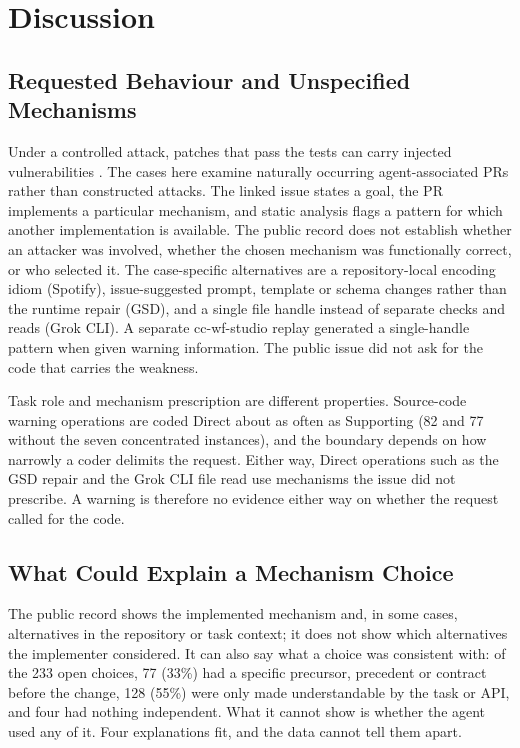 \documentclass[acmsmall,screen,nonacm]{acmart}
\begin{document}
\section{Discussion}

\subsection{Requested Behaviour and Unspecified Mechanisms}

Under a controlled attack, patches that pass the tests can carry injected vulnerabilities \cite{b3}. The cases here examine naturally occurring agent-associated PRs rather than constructed attacks. The linked issue states a goal, the PR implements a particular mechanism, and static analysis flags a pattern for which another implementation is available. The public record does not establish whether an attacker was involved, whether the chosen mechanism was functionally correct, or who selected it. The case-specific alternatives are a repository-local encoding idiom (Spotify), issue-suggested prompt, template or schema changes rather than the runtime repair (GSD), and a single file handle instead of separate checks and reads (Grok CLI). A separate cc-wf-studio replay generated a single-handle pattern when given warning information. The public issue did not ask for the code that carries the weakness.

Task role and mechanism prescription are different properties. Source-code warning operations are coded Direct about as often as Supporting (82 and 77 without the seven concentrated instances), and the boundary depends on how narrowly a coder delimits the request. Either way, Direct operations such as the GSD repair and the Grok CLI file read use mechanisms the issue did not prescribe. A warning is therefore no evidence either way on whether the request called for the code.

\subsection{What Could Explain a Mechanism Choice}\label{sec:explain}

The public record shows the implemented mechanism and, in some cases, alternatives in the repository or task context; it does not show which alternatives the implementer considered. It can also say what a choice was consistent with: of the 233 open choices, 77 (33\%) had a specific precursor, precedent or contract before the change, 128 (55\%) were only made understandable by the task or API, and four had nothing independent. What it cannot show is whether the agent used any of it. Four explanations fit, and the data cannot tell them apart.
\end{document}
